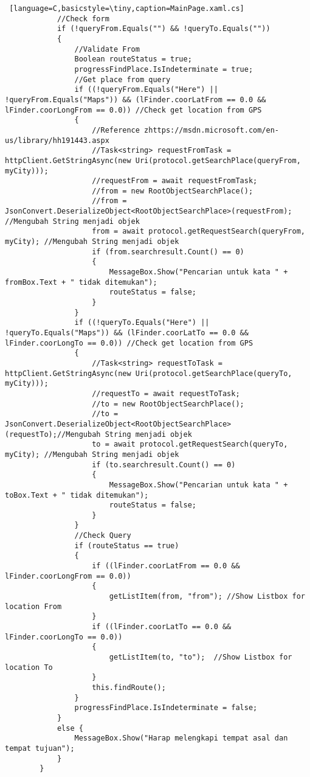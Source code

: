 \begin{lstlisting} [language=C,basicstyle=\tiny,caption=MainPage.xaml.cs]
            //Check form
            if (!queryFrom.Equals("") && !queryTo.Equals(""))
            {
                //Validate From
                Boolean routeStatus = true;
                progressFindPlace.IsIndeterminate = true;
                //Get place from query
                if ((!queryFrom.Equals("Here") || !queryFrom.Equals("Maps")) && (lFinder.coorLatFrom == 0.0 && lFinder.coorLongFrom == 0.0)) //Check get location from GPS
                {
                    //Reference zhttps://msdn.microsoft.com/en-us/library/hh191443.aspx
                    //Task<string> requestFromTask = httpClient.GetStringAsync(new Uri(protocol.getSearchPlace(queryFrom, myCity)));
                    //requestFrom = await requestFromTask;
                    //from = new RootObjectSearchPlace();
                    //from = JsonConvert.DeserializeObject<RootObjectSearchPlace>(requestFrom); //Mengubah String menjadi objek
                    from = await protocol.getRequestSearch(queryFrom, myCity); //Mengubah String menjadi objek
                    if (from.searchresult.Count() == 0)
                    {
                        MessageBox.Show("Pencarian untuk kata " + fromBox.Text + " tidak ditemukan");
                        routeStatus = false;
                    }
                }
                if ((!queryTo.Equals("Here") || !queryTo.Equals("Maps")) && (lFinder.coorLatTo == 0.0 && lFinder.coorLongTo == 0.0)) //Check get location from GPS
                {
                    //Task<string> requestToTask = httpClient.GetStringAsync(new Uri(protocol.getSearchPlace(queryTo, myCity)));
                    //requestTo = await requestToTask;
                    //to = new RootObjectSearchPlace();
                    //to = JsonConvert.DeserializeObject<RootObjectSearchPlace>(requestTo);//Mengubah String menjadi objek
                    to = await protocol.getRequestSearch(queryTo, myCity); //Mengubah String menjadi objek
                    if (to.searchresult.Count() == 0)
                    {
                        MessageBox.Show("Pencarian untuk kata " + toBox.Text + " tidak ditemukan");
                        routeStatus = false;
                    }
                }
                //Check Query
                if (routeStatus == true)
                {
                    if ((lFinder.coorLatFrom == 0.0 && lFinder.coorLongFrom == 0.0))
                    {
                        getListItem(from, "from"); //Show Listbox for location From
                    }
                    if ((lFinder.coorLatTo == 0.0 && lFinder.coorLongTo == 0.0))
                    {
                        getListItem(to, "to");  //Show Listbox for location To
                    }
                    this.findRoute();
                }
                progressFindPlace.IsIndeterminate = false;
            }
            else {
                MessageBox.Show("Harap melengkapi tempat asal dan tempat tujuan");
            }
        }


\end{lstlisting}
